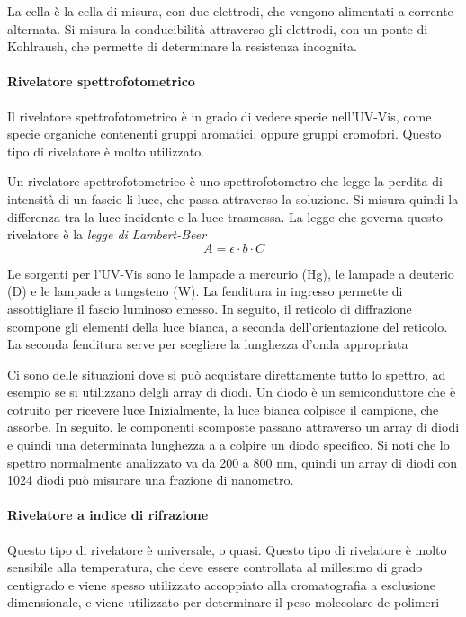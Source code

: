 La cella è la cella di misura, con due elettrodi, che vengono alimentati a corrente alternata. Si misura la conducibilità attraverso gli elettrodi, con un ponte di 
Kohlraush, che permette di determinare la resistenza incognita.


\paragraph{Rivelatore spettrofotometrico}
Il rivelatore spettrofotometrico è in grado di vedere specie nell'UV-Vis, come specie organiche contenenti gruppi aromatici, oppure gruppi cromofori.
Questo tipo di rivelatore è molto utilizzato.

Un rivelatore spettrofotometrico è uno spettrofotometro che legge la perdita di intensità di un fascio li luce, che passa attraverso la soluzione.
Si misura quindi la differenza tra la luce incidente e la luce trasmessa. La legge che governa questo rivelatore è la \emph{legge di Lambert-Beer}
\[
A = \epsilon \cdot b \cdot C
\]


Le sorgenti per l'UV-Vis sono le lampade a mercurio (Hg), le lampade a deuterio (D) e le lampade a tungsteno (W).
La fenditura in ingresso permette di assottigliare il fascio luminoso emesso. In seguito, il reticolo di diffrazione scompone gli elementi della luce bianca, a seconda dell'orientazione del reticolo.
La seconda fenditura serve per scegliere la lunghezza d'onda appropriata

Ci sono delle situazioni dove si può acquistare direttamente tutto lo spettro, ad esempio se si utilizzano delgli array di diodi. Un diodo è un semiconduttore che è cotruito per ricevere luce
Inizialmente, la luce bianca colpisce il campione, che assorbe. In seguito, le componenti scomposte passano attraverso un array di diodi e quindi una determinata lunghezza a a colpire un diodo specifico.
Si noti che lo spettro normalmente analizzato va da 200 a 800 nm, quindi un array di diodi con 1024 diodi può misurare una frazione di nanometro.

\paragraph{Rivelatore a indice di rifrazione}
Questo tipo di rivelatore è universale, o quasi. Questo tipo di rivelatore è molto sensibile alla temperatura, che deve essere controllata al millesimo di grado centigrado e 
viene spesso utilizzato accoppiato alla cromatografia a esclusione dimensionale, e viene utilizzato per determinare il peso molecolare de polimeri

